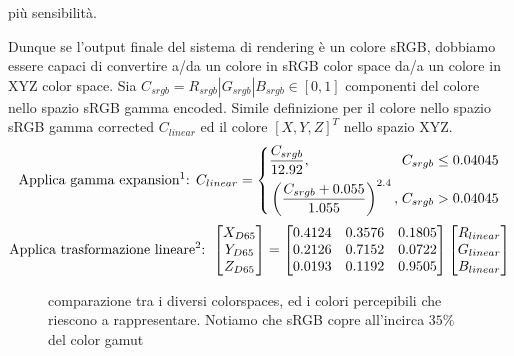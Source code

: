 pi\`u sensibilit\`a.\par
Dunque se l'output finale del sistema di rendering \`e un colore sRGB, dobbiamo essere capaci di convertire a/da un colore in sRGB color space da/a un
colore in XYZ color space. Sia $C_{srgb} = R_{srgb}|G_{srgb}|B_{srgb} \in [0,1]$ componenti del colore nello spazio sRGB gamma encoded. Simile
definizione per il colore nello spazio sRGB gamma corrected $C_{linear}$ ed il colore $[X, Y, Z]^T$ nello spazio XYZ.
\begin{equation}\label{chapter2:colorimetry:sRGB2XYZ}
	\text{Applica gamma expansion\footnotemark{}: }C_{linear} = \left\{\begin{alignedat}{2}
		&\frac{C_{srgb}}{12.92}, &C_{srgb}\leq 0.04045\\
		&\left(\frac{C_{srgb}+0.055}{1.055}\right)^{2.4},\;&C_{srgb}> 0.04045
	\end{alignedat}\right.
\end{equation}
\begin{equation}
	\text{Applica trasformazione lineare\footnotemark{}: }\begin{bmatrix}
		X_{D65}\\ Y_{D65}\\ Z_{D65}
	\end{bmatrix}=
	\begin{bmatrix}
		0.4124 & 0.3576 & 0.1805 \\
		0.2126 & 0.7152 & 0.0722 \\
		0.0193 & 0.1192 & 0.9505 
	\end{bmatrix}
	\begin{bmatrix}
		R_{linear} \\ G_{linear} \\ B_{linear}
	\end{bmatrix}
\end{equation}
\begin{figure}[tb]
	
	\caption{comparazione tra i diversi colorspaces, ed i colori percepibili che riescono a rappresentare. Notiamo che sRGB copre all'incirca $35\%$
	del color gamut}
	\label{chapter2:colorimetry:gamut}
\end{figure}
